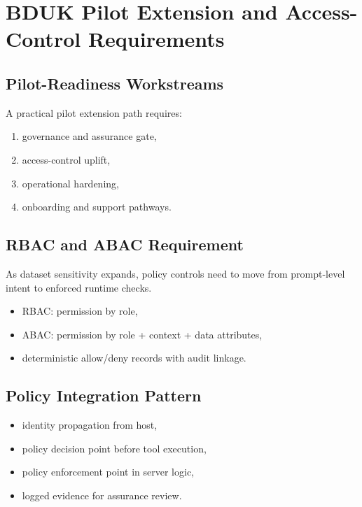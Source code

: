 \chapter{BDUK Pilot Extension and Access-Control Requirements}
\label{ch:bduk}

\section{Pilot-Readiness Workstreams}

A practical pilot extension path requires:
\begin{enumerate}
  \item governance and assurance gate,
  \item access-control uplift,
  \item operational hardening,
  \item onboarding and support pathways.
\end{enumerate}

\section{RBAC and ABAC Requirement}

As dataset sensitivity expands, policy controls need to move from prompt-level
intent to enforced runtime checks.

\begin{itemize}
  \item RBAC: permission by role,
  \item ABAC: permission by role + context + data attributes,
  \item deterministic allow/deny records with audit linkage.
\end{itemize}

\section{Policy Integration Pattern}

\begin{itemize}
  \item identity propagation from host,
  \item policy decision point before tool execution,
  \item policy enforcement point in server logic,
  \item logged evidence for assurance review.
\end{itemize}
